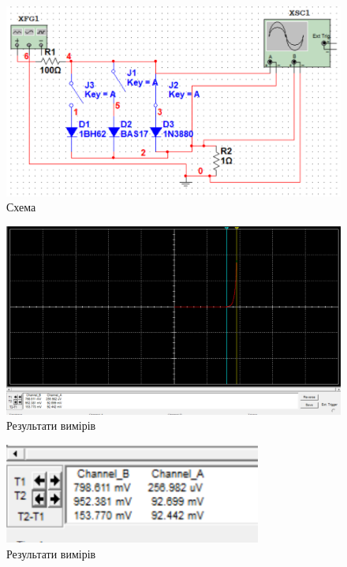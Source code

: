 \begin{figure}[ht]

\centering

\includegraphics[width=0.6\linewidth]{Діод3Схема.png}

\caption{Схема}

\label{Diod3Shema}

\end{figure}

\begin{figure}[ht]

\centering

\includegraphics[width=0.75\linewidth]{Діод3Осцилограф.png}

\caption{Результати вимірів}

\label{Diod3Osc}

\end{figure}

\begin{figure}[ht]

\centering

\includegraphics[width=0.3\linewidth]{Діод3Рез.png}

\caption{Результати вимірів}

\label{Diod3Rez}

\end{figure}
